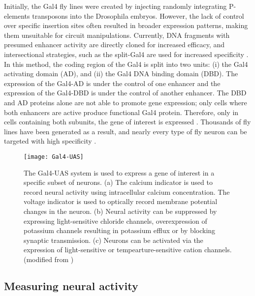 Initially, the Gal4 fly lines were created by injecting randomly integrating P-elements transposons into the Drosophila embryos. However, the lack of control over specific insertion sites often resulted in broader expression patterns, making them unsuitable for circuit manipulations. Currently, DNA fragments with presumed enhancer activity are directly cloned for increased efficacy, and intersectional strategies, such as the split-Gal4 are used for increased specificity \parencite{Pfeiffer2008, Jenett2012}. In this method, the coding region of the Gal4 is split into two units: (i) the Gal4 activating domain (AD), and (ii) the Gal4 DNA binding domain (DBD). The expression of the Gal4-AD is under the control of one enhancer and the expression of the Gal4-DBD is under the control of another enhancer. The DBD and AD proteins alone are not able to promote gene expression; only cells where both enhancers are active produce functional Gal4 protein. Therefore, only in cells containing both subunits, the gene of interest is expressed \parencite{Luan2006}. Thousands of fly lines have been generated as a result, and nearly every type of fly neuron can be targeted with high specificity \parencite{Pfeiffer2010}.
\begin{figure}
\centering
\hspace*{-1cm} 
\texttt{[image: Gal4-UAS]}
\caption[Genetic tools for functional manipulations in \textit{Drosophila}] {The Gal4-UAS system is used to express a gene of interest in a specific subset of neurons. (a) The calcium indicator is used to record neural activity using intracellular calcium concentration. The voltage indicator is used to optically record membrane potential changes in the neuron. (b) Neural activity can be suppressed by expressing light-sensitive chloride channels, overexpression of potassium channels resulting in potassium efflux or by blocking synaptic transmission. (c) Neurons can be activated via the expression of light-sensitive or tempearture-sensitive cation channels. (modified from \cite{Borst2009})}
\label{fig:gal4uas}
\end{figure}

\subsection{Measuring neural activity}
